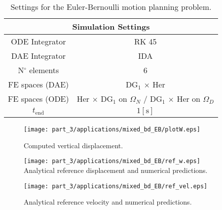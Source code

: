\begin{table}[th]
	\centering
	\begin{tabular}{|c|c|}
		\hline 
		\multicolumn{2}{|c|}{Simulation Settings} \\ 
		\hline 
		ODE Integrator & RK 45\\
		DAE Integrator & IDA \\ 
		N$^\circ$ elements & 6 \\ 
		FE spaces (DAE) & DG$_1$ $\times$ Her \\
		FE spaces (ODE) & Her $\times$ DG$_1$ on $\Omega_N$ / DG$_1$ $\times$ Her on $\Omega_D$ \\
		$t_{\text{end}}$& $1  [\textrm{s}]$ \\ 
		\hline 
	\end{tabular} 
	\vspace{1mm}
	\caption{Settings for the Euler-Bernoulli motion planning problem.}
	\label{tab:parEBmotion}
\end{table}

\begin{figure}[th]
	\centering
	\texttt{[image: part\_3/applications/mixed\_bd\_EB/plotW.eps]} \\
	\caption{Computed vertical displacement.}
	\label{fig:w_motplan_EB}
\end{figure}


\begin{figure}[bth!]
\begin{minipage}[t]{0.5\linewidth}
	\centering
	\texttt{[image: part\_3/applications/mixed\_bd\_EB/ref\_w.eps]} \\
	\caption{Analytical reference displacement and numerical predictions.}
	\label{fig:refw_EB}
\end{minipage}\hspace{0.5cm}
\begin{minipage}[t]{0.5\linewidth}
	\centering
	\texttt{[image: part\_3/applications/mixed\_bd\_EB/ref\_vel.eps]} \\
	\caption{Analytical reference velocity and numerical predictions.}
	\label{fig:refv_EB}
\end{minipage}
\end{figure}

